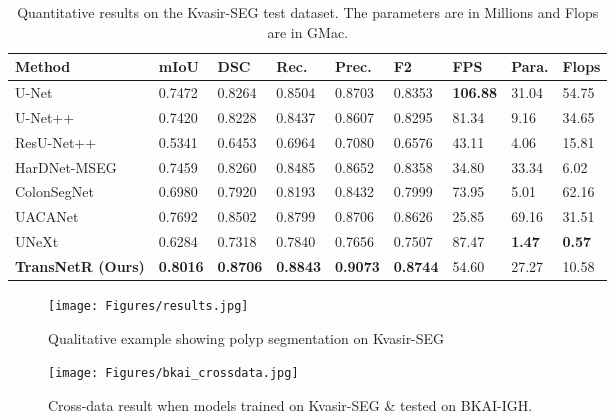 \documentclass{midl} \usepackage{mwe}
\begin{document}
\begin{table*}[t!]
   \footnotesize
\centering
\caption{Quantitative results on the Kvasir-SEG test dataset. The parameters are in Millions and Flops are in GMac.}
\begin{tabular}{p{5.2cm}|p{0.8cm}|p{0.8cm}|p{0.8cm}|p{0.8cm}|p{0.8cm}|p{0.8cm}| p{0.8cm}|p{0.8cm} }
\toprule
\textbf{Method}  & \textbf{mIoU}  &\textbf{DSC}  &\textbf{Rec.}& \textbf{Prec.} &\textbf{F2} &\textbf{FPS} &{\textbf{Para.}} &{\textbf{Flops}}\\ 
\hline

U-Net~\cite{ronneberger2015u} &	0.7472&	0.8264&	0.8504&	0.8703&	0.8353 &\textbf{106.88} &{31.04} &{54.75} \\
U-Net++~\cite{zhou2018unet++}&	0.7420&	0.8228&	0.8437&	0.8607&	0.8295 & 81.34 &{9.16} &{34.65}\\
ResU-Net++~\cite{jha2019resunet++}&	0.5341&	0.6453&	0.6964&	0.7080&	0.6576 & 43.11 &4.06 &{15.81}\\
HarDNet-MSEG~\cite{huang2021hardnet}&	0.7459&	0.8260&	0.8485&	0.8652&	0.8358 &34.80 &33.34 &{6.02}\\
ColonSegNet~\cite{jha2021real}&	0.6980&	0.7920&	0.8193&	0.8432&	0.7999 &73.95 &5.01 &{62.16} \\
UACANet~\cite{kim2021uacanet} &0.7692 &0.8502 &0.8799 &0.8706 &0.8626 &25.85 &69.16 &31.51 \\
UNeXt~\cite{valanarasu2022unext} &0.6284 &0.7318 &0.7840 &0.7656 &0.7507 &87.47 &\textbf{1.47} &\textbf{0.57}\\



\textbf{TransNetR (Ours)} &\textbf{0.8016} &\textbf{0.8706} & \textbf{0.8843} & \textbf{0.9073} &  \textbf{0.8744} & 54.60 &27.27 &10.58\\
\bottomrule
\end{tabular}
\label{tab:results}
\vspace{-5mm}
\end{table*}

\begin{figure}[!t]
\centering
\texttt{[image: Figures/results.jpg]} \caption{Qualitative example showing polyp segmentation on Kvasir-SEG~\cite{jha2020kvasir}}
\label{fig:qualitativekvasair}
\vspace{-7mm}
\end{figure}

\begin{figure*}[!t]
\centering
\texttt{[image: Figures/bkai\_crossdata.jpg]}
\caption{Cross-data result when models trained on Kvasir-SEG \& tested on BKAI-IGH.}
\label{fig:qualitativebkai}
\vspace{-8mm}
\end{figure*}
\end{document}
